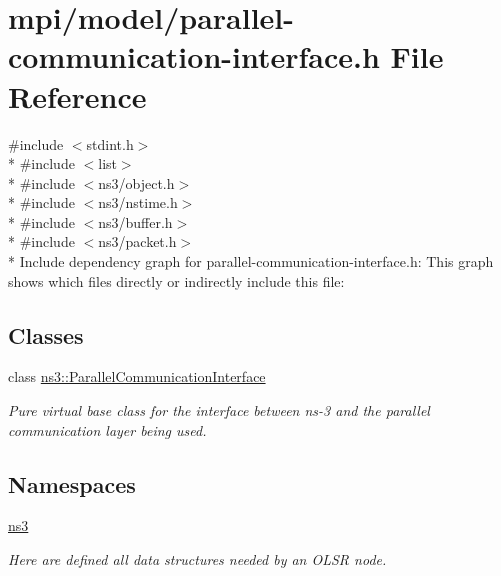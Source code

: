 \hypertarget{parallel-communication-interface_8h}{}\section{mpi/model/parallel-\/communication-\/interface.h File Reference}
\label{parallel-communication-interface_8h}
{\ttfamily \#include $<$stdint.\+h$>$}\\*
{\ttfamily \#include $<$list$>$}\\*
{\ttfamily \#include $<$ns3/object.\+h$>$}\\*
{\ttfamily \#include $<$ns3/nstime.\+h$>$}\\*
{\ttfamily \#include $<$ns3/buffer.\+h$>$}\\*
{\ttfamily \#include $<$ns3/packet.\+h$>$}\\*
Include dependency graph for parallel-\/communication-\/interface.h\+:
This graph shows which files directly or indirectly include this file\+:
\subsection*{Classes}
\begin{DoxyCompactItemize}
\item 
class \hyperlink{classns3_1_1ParallelCommunicationInterface}{ns3\+::\+Parallel\+Communication\+Interface}
\begin{DoxyCompactList}\small\item\em Pure virtual base class for the interface between ns-\/3 and the parallel communication layer being used. \end{DoxyCompactList}\end{DoxyCompactItemize}
\subsection*{Namespaces}
\begin{DoxyCompactItemize}
\item 
 \hyperlink{namespacens3}{ns3}
\begin{DoxyCompactList}\small\item\em Here are defined all data structures needed by an O\+L\+SR node. \end{DoxyCompactList}\end{DoxyCompactItemize}
